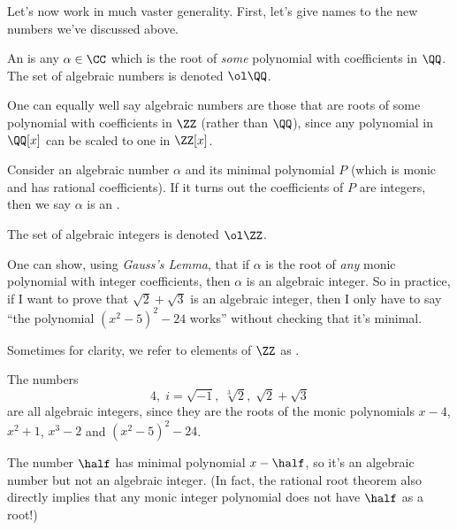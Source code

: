 Let's now work in much vaster generality.
First, let's give names to the new numbers we've discussed above.
\begin{definition}
	An  is any $\alpha \in \CC$
	which is the root of \emph{some} polynomial with coefficients in $\QQ$.
	The set of algebraic numbers is denoted $\ol\QQ$.
\end{definition}
\begin{remark}
	One can equally well say algebraic numbers are those that
	are roots of some polynomial with coefficients in $\ZZ$ (rather than $\QQ$),
	since any polynomial in $\QQ[x]$ can be scaled to one in $\ZZ[x]$.
\end{remark}
\begin{definition}
	Consider an algebraic number $\alpha$ and
	its minimal polynomial $P$
	(which is monic and has rational coefficients).
	If it turns out the coefficients of $P$ are integers,
	then we say $\alpha$ is an .

	The set of algebraic integers is denoted $\ol\ZZ$.
\end{definition}
\begin{remark}
	One can show, using \emph{Gauss's Lemma}, that if $\alpha$ is the root
	of \emph{any} monic polynomial with integer coefficients,
	then $\alpha$ is an algebraic integer.
	So in practice, if I want to prove that $\sqrt 2 + \sqrt 3$ is an algebraic integer,
	then I only have to say ``the polynomial $(x^2-5)^2-24$ works''
	without checking that it's minimal.
\end{remark}
Sometimes for clarity, we refer to elements of $\ZZ$
as .
\begin{example}
	The numbers
	\[ 4, \; i = \sqrt{-1}, \; \sqrt[3]{2}, \; \sqrt2+\sqrt3 \]
	are all algebraic integers, since they are the roots of the monic polynomials
	$x-4$, $x^2+1$, $x^3-2$ and $(x^2-5)^2-24$.

	The number $\half$ has minimal polynomial $x - \half$,
	so it's an algebraic number but not an algebraic integer.
	(In fact, the rational root theorem also directly implies
	that any monic integer polynomial does not have $\half$ as a root!)
\end{example}

